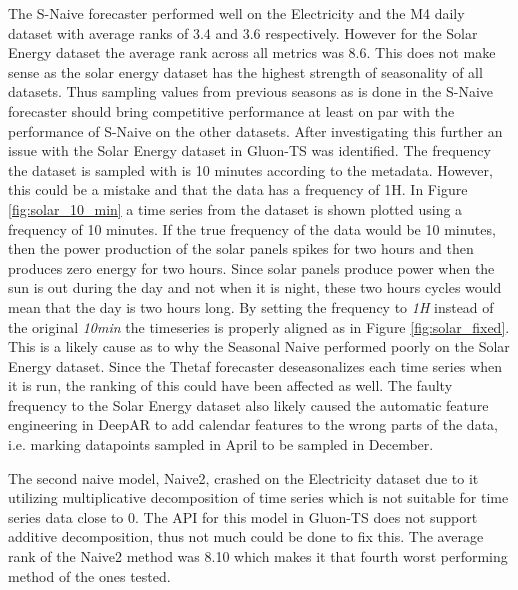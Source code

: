 The S-Naive forecaster performed well on the Electricity and the M4 daily dataset with average ranks of 3.4 and 3.6 respectively. However for the Solar Energy dataset the average rank across all metrics was 8.6. This does not make sense as the solar energy dataset has the highest strength of seasonality of all datasets. Thus sampling values from previous seasons as is done in the S-Naive forecaster should bring competitive performance at least on par with the performance of S-Naive on the other datasets. After investigating this further an issue with the Solar Energy dataset in Gluon-TS was identified. The frequency the dataset is sampled with is 10 minutes according to the metadata. However, this could be a mistake and that the data has a frequency of 1H. In Figure \ref{fig:solar_10_min} a time series from the dataset is shown plotted using a frequency of 10 minutes. If the true frequency of the data would be 10 minutes, then the power production of the solar panels spikes for two hours and then produces zero energy for two hours. Since solar panels produce power when the sun is out during the day and not when it is night, these two hours cycles would mean that the day is two hours long. By setting the frequency to \textit{1H} instead of the original \textit{10min} the timeseries is properly aligned as in Figure \ref{fig:solar_fixed}. This is a likely cause as to why the Seasonal Naive performed poorly on the Solar Energy dataset. Since the Thetaf forecaster deseasonalizes each time series when it is run, the ranking of this could have been affected as well. The faulty frequency to the Solar Energy dataset also likely caused the automatic feature engineering in DeepAR to add calendar features to the wrong parts of the data, i.e. marking datapoints sampled in April to be sampled in December.

The second naive model, Naive2, crashed on the Electricity dataset due to it utilizing multiplicative decomposition of time series which is not suitable for time series data close to 0. The API for this model in Gluon-TS does not support additive decomposition, thus not much could be done to fix this. The average rank of the Naive2 method was 8.10 which makes it that fourth worst performing method of the ones tested.

